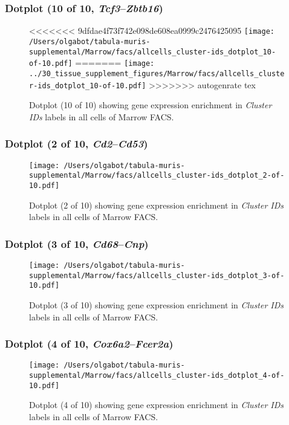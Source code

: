 \clearpage

\subsubsection{Dotplot (10 of 10, \emph{Tcf3}--\emph{Zbtb16})}
\begin{figure}[h]
\centering
<<<<<<< 9dfdae4f73f742e098de608ea0999c2476425095
\texttt{[image: /Users/olgabot/tabula-muris-supplemental/Marrow/facs/allcells\_cluster-ids\_dotplot\_10-of-10.pdf]}
=======
\texttt{[image: ../30\_tissue\_supplement\_figures/Marrow/facs/allcells\_cluster-ids\_dotplot\_10-of-10.pdf]}
>>>>>>> autogenrate tex

\caption{ Dotplot (10 of 10)  showing gene expression enrichment in \emph{Cluster IDs} labels in all cells of Marrow FACS. }
\end{figure}


\clearpage

\subsubsection{Dotplot (2 of 10, \emph{Cd2}--\emph{Cd53})}
\begin{figure}[h]
\centering
\texttt{[image: /Users/olgabot/tabula-muris-supplemental/Marrow/facs/allcells\_cluster-ids\_dotplot\_2-of-10.pdf]}

\caption{ Dotplot (2 of 10)  showing gene expression enrichment in \emph{Cluster IDs} labels in all cells of Marrow FACS. }
\end{figure}


\clearpage

\subsubsection{Dotplot (3 of 10, \emph{Cd68}--\emph{Cnp})}
\begin{figure}[h]
\centering
\texttt{[image: /Users/olgabot/tabula-muris-supplemental/Marrow/facs/allcells\_cluster-ids\_dotplot\_3-of-10.pdf]}

\caption{ Dotplot (3 of 10)  showing gene expression enrichment in \emph{Cluster IDs} labels in all cells of Marrow FACS. }
\end{figure}


\clearpage

\subsubsection{Dotplot (4 of 10, \emph{Cox6a2}--\emph{Fcer2a})}
\begin{figure}[h]
\centering
\texttt{[image: /Users/olgabot/tabula-muris-supplemental/Marrow/facs/allcells\_cluster-ids\_dotplot\_4-of-10.pdf]}

\caption{ Dotplot (4 of 10)  showing gene expression enrichment in \emph{Cluster IDs} labels in all cells of Marrow FACS. }
\end{figure}


